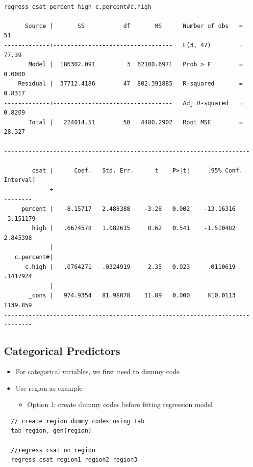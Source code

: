 \documentclass[]{book}
\providecommand{\tightlist}{%
  \setlength{\itemsep}{0pt}\setlength{\parskip}{0pt}}
\begin{document}
\begin{verbatim}

regress csat percent high c.percent#c.high

      Source |       SS           df       MS      Number of obs   =        51
-------------+----------------------------------   F(3, 47)        =     77.39
       Model |  186302.091         3  62100.6971   Prob > F        =    0.0000
    Residual |  37712.4186        47  802.391885   R-squared       =    0.8317
-------------+----------------------------------   Adj R-squared   =    0.8209
       Total |   224014.51        50   4480.2902   Root MSE        =    28.327

------------------------------------------------------------------------------
        csat |      Coef.   Std. Err.      t    P>|t|     [95% Conf. Interval]
-------------+----------------------------------------------------------------
     percent |   -8.15717   2.488388    -3.28   0.002    -13.16316   -3.151179
        high |   .6674578   1.082615     0.62   0.541    -1.510482    2.845398
             |
   c.percent#|
      c.high |   .0764271   .0324919     2.35   0.023     .0110619    .1417924
             |
       _cons |   974.9354   81.98078    11.89   0.000     810.0113    1139.859
------------------------------------------------------------------------------
\end{verbatim}

\hypertarget{categorical-predictors}{%
\subsection{Categorical Predictors}\label{categorical-predictors}}

\begin{itemize}
\tightlist
\item
  For categorical variables, we first need to dummy code
\item
  Use region as example

  \begin{itemize}
  \tightlist
  \item
    Option 1: create dummy codes before fitting regression model
  \end{itemize}
\end{itemize}

\begin{verbatim}
  // create region dummy codes using tab 
  tab region, gen(region)

  //regress csat on region
  regress csat region1 region2 region3
\end{verbatim}
\end{document}
